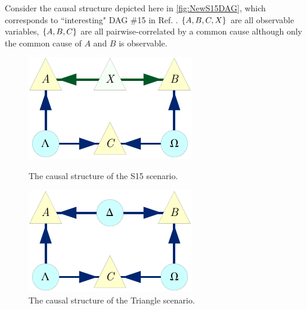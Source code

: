 Consider the causal structure depicted here in \cref{fig:NewS15DAG}, which corresponds to ``interesting" DAG \#15 in Ref. \cite{pusey2014gdag}. $\left\lbrace A,B,C,X\right\rbrace$ are all observable variables, $\left\lbrace A,B,C\right\rbrace$ are all pairwise-correlated by a common cause although only the common cause of $A$ and $B$ is observable.


\begin{figure}[H]
\centering
\begin{minipage}[b]{0.49\linewidth}
\centering
\includegraphics[scale=1]{NewS15DAG.pdf}
\caption{The causal structure of the S15 scenario.}\label{fig:NewS15DAG}
\end{minipage}
\hfill
\begin{minipage}[b]{0.49\linewidth}
\centering
\includegraphics[scale=1]{NewTriDAG.pdf}
\caption{The causal structure of the Triangle scenario.}\label{fig:NewTriDAG}
\end{minipage}
\end{figure}

